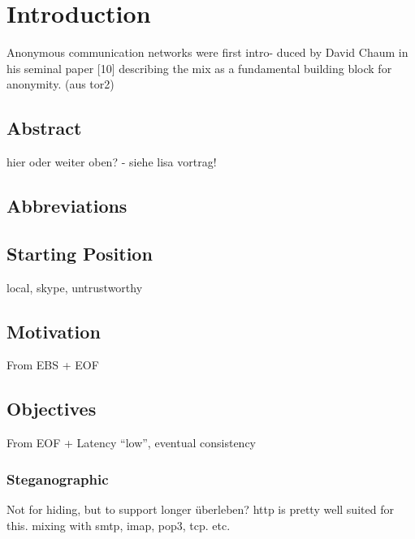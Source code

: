 \section{Introduction}

Anonymous communication networks were first intro-
duced by David Chaum in his seminal paper [10] describing
the mix as a fundamental building block for anonymity.
(aus tor2)

\subsection{Abstract}
hier oder weiter oben? - siehe lisa vortrag!

\subsection{Abbreviations}
\subsection{Starting Position}
local, skype, untrustworthy

\subsection{Motivation}
From EBS + EOF

\subsection{Objectives}
From EOF + Latency "`low"', eventual consistency
\subsubsection{Steganographic}
Not for hiding, but to support longer überleben?
http is pretty well suited for this.
mixing with smtp, imap, pop3, tcp. etc.


